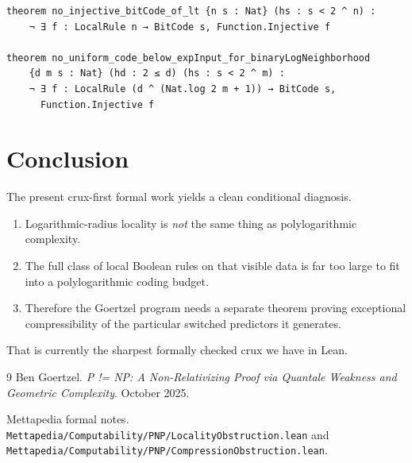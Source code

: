 \documentclass[11pt]{article}
\theoremstyle{remark}
\begin{document}
\begin{lstlisting}[caption={Core counting obstruction}]
theorem no_injective_bitCode_of_lt {n s : Nat} (hs : s < 2 ^ n) :
    ¬ ∃ f : LocalRule n → BitCode s, Function.Injective f

theorem no_uniform_code_below_expInput_for_binaryLogNeighborhood
    {d m s : Nat} (hd : 2 ≤ d) (hs : s < 2 ^ m) :
    ¬ ∃ f : LocalRule (d ^ (Nat.log 2 m + 1)) → BitCode s,
      Function.Injective f
\end{lstlisting}

\section{Conclusion}

The present crux-first formal work yields a clean conditional diagnosis.

\begin{enumerate}[leftmargin=1.5em]
  \item Logarithmic-radius locality is \emph{not} the same thing as polylogarithmic complexity.
  \item The full class of local Boolean rules on that visible data is far too large to fit into a
  polylogarithmic coding budget.
  \item Therefore the Goertzel program needs a separate theorem proving exceptional compressibility
  of the particular switched predictors it generates.
\end{enumerate}

That is currently the sharpest formally checked crux we have in Lean.

\begin{thebibliography}{9}
Ben Goertzel.
\newblock \emph{P != NP: A Non-Relativizing Proof via Quantale Weakness and Geometric Complexity}.
\newblock October 2025.

Mettapedia formal notes.
\newblock \texttt{Mettapedia/Computability/PNP/LocalityObstruction.lean} and
\texttt{Mettapedia/Computability/PNP/CompressionObstruction.lean}.
\end{thebibliography}
\end{document}
